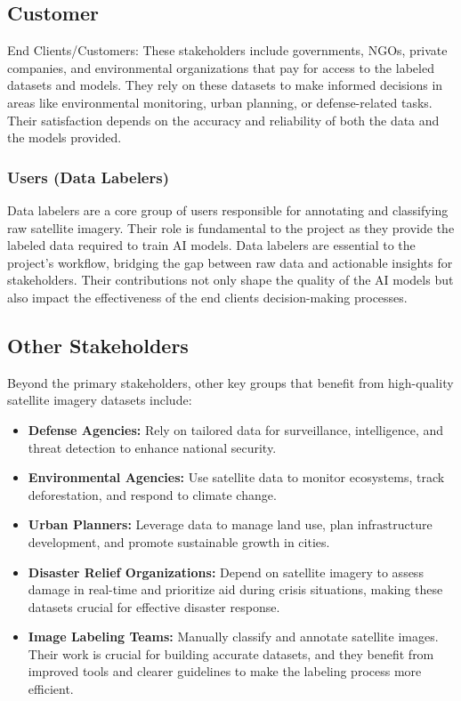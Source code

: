 \documentclass[12pt]{article}
\begin{document}
\subsection{Customer}
End Clients/Customers: These stakeholders include governments, NGOs, private companies, and environmental organizations that pay for access to the labeled datasets and models. They rely on these datasets to make informed decisions in areas like environmental monitoring, urban planning, or defense-related tasks. Their satisfaction depends on the accuracy and reliability of both the data and the models provided.


\subsubsection{Users (Data Labelers)}
Data labelers are a core group of users responsible for annotating and classifying raw satellite imagery. Their role is fundamental to the project as they provide the labeled data required to train AI models. Data labelers are essential to the project's workflow, bridging the gap between raw data and actionable insights for stakeholders. Their contributions not only shape the quality of the AI models but also impact the effectiveness of the end clients decision-making processes.


\subsection{Other Stakeholders}
Beyond the primary stakeholders, other key groups that benefit from high-quality satellite imagery datasets include:
\begin{itemize}
    \item \textbf{Defense Agencies:} Rely on tailored data for surveillance, intelligence, and threat detection to enhance national security.
    \item \textbf{Environmental Agencies:} Use satellite data to monitor ecosystems, track deforestation, and respond to climate change.
    \item \textbf{Urban Planners:} Leverage data to manage land use, plan infrastructure development, and promote sustainable growth in cities.
    \item \textbf{Disaster Relief Organizations:} Depend on satellite imagery to assess damage in real-time and prioritize aid during crisis situations, making these datasets crucial for effective disaster response.
    \item \textbf{Image Labeling Teams:} Manually classify and annotate satellite images. Their work is crucial for building accurate datasets, and they benefit from improved tools and clearer guidelines to make the labeling process more efficient.
\end{itemize}
\end{document}
